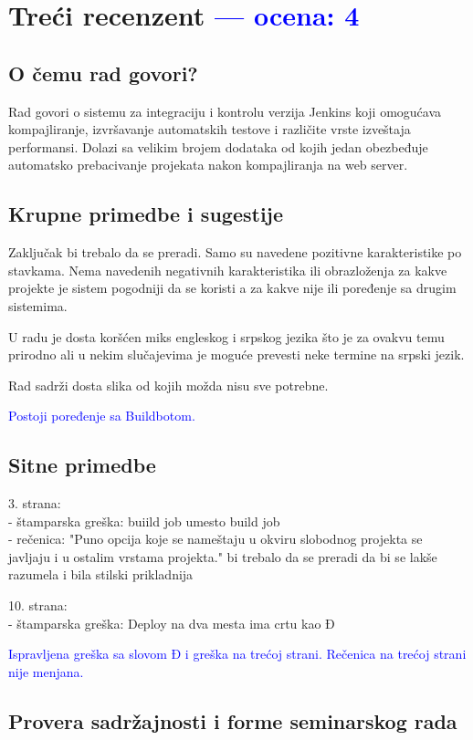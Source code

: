 \documentclass[a4paper]{report}
\newcommand{\odgovor}[1]{\textcolor{blue}{#1}}
\begin{document}
\chapter{Treći recenzent \odgovor{--- ocena: 4} }
\section{O čemu rad govori?}
Rad govori o sistemu za integraciju i kontrolu verzija Jenkins koji omogućava kompajliranje, izvršavanje automatskih testove i različite vrste izveštaja performansi. Dolazi sa velikim brojem dodataka od kojih jedan obezbeđuje automatsko prebacivanje projekata nakon kompajliranja na web server.

\section{Krupne primedbe i sugestije}
Zaključak bi trebalo da se preradi. Samo su navedene pozitivne karakteristike po stavkama. Nema navedenih negativnih karakteristika ili obrazloženja
za kakve projekte je sistem pogodniji da se koristi a za kakve nije ili poređenje sa drugim sistemima.

U radu je dosta koršćen miks engleskog i srpskog jezika što je za ovakvu temu prirodno ali u nekim slučajevima je moguće prevesti neke 
termine na srpski jezik.

Rad sadrži dosta slika od kojih možda nisu sve potrebne. 

\odgovor{Postoji poređenje sa Buildbotom.}

\section{Sitne primedbe}
3. strana:\\
- štamparska greška: buiild job umesto build job\\
- rečenica: "Puno opcija koje se nameštaju u okviru slobodnog projekta se javljaju i u ostalim vrstama projekta." bi trebalo da se preradi
da bi se lakše razumela i bila stilski prikladnija

10. strana:\\
- štamparska greška: Deploy na dva mesta ima crtu kao Đ

\odgovor{Ispravljena greška sa slovom Đ i greška na trećoj strani. Rečenica na trećoj strani nije menjana.}
 

\section{Provera sadržajnosti i forme seminarskog rada}
\end{document}
